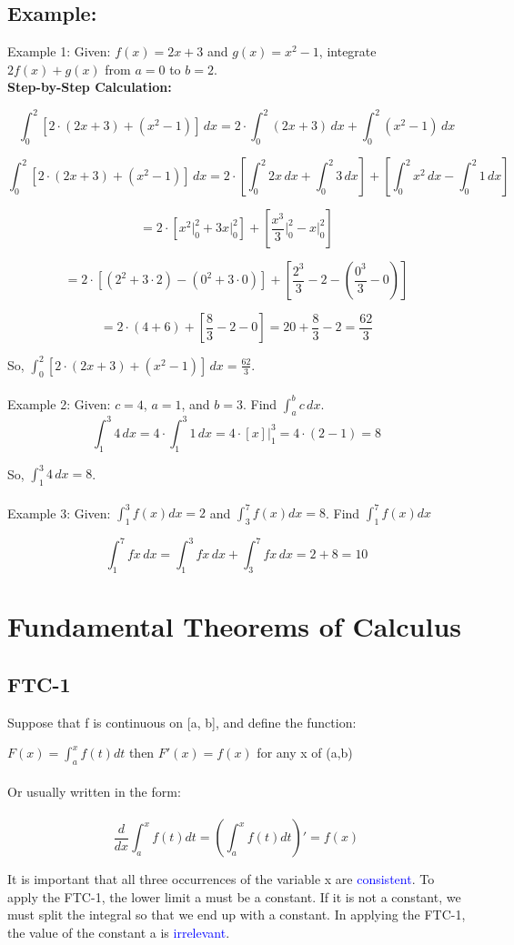 \documentclass{article}
\begin{document}
\subsection{Example:}

Example 1: Given: $f(x) = 2x + 3$ and $g(x) = x^2 - 1$, integrate $2f(x) + g(x)$ from $a = 0$ to $b = 2$.
\\
\textbf{Step-by-Step Calculation:}

\[
\int_0^2 [2 \cdot (2x + 3) + (x^2 - 1)] \,dx = 2 \cdot \int_0^2 (2x + 3) \,dx + \int_0^2 (x^2 - 1) \,dx
\]

\[
\int_0^2 [2 \cdot (2x + 3) + (x^2 - 1)] \,dx = 2 \cdot \left[\int_0^2 2x \,dx + \int_0^2 3 \,dx\right] + \left[\int_0^2 x^2 \,dx - \int_0^2 1 \,dx\right]
\]

\[
= 2 \cdot \left[x^2 \bigg|_0^2 + 3x \bigg|_0^2\right] + \left[\frac{x^3}{3} \bigg|_0^2 - x \bigg|_0^2\right]
\]

\[
= 2 \cdot [(2^2 + 3 \cdot 2) - (0^2 + 3 \cdot 0)] + \left[\frac{2^3}{3} - 2 - \left(\frac{0^3}{3} - 0\right)\right]
\]

\[
= 2 \cdot (4 + 6) + \left[\frac{8}{3} - 2 - 0\right] = 20 + \frac{8}{3} - 2 = \frac{62}{3}
\]

So, $\int_0^2 [2 \cdot (2x + 3) + (x^2 - 1)] \,dx = \frac{62}{3}$.
\\
\\
Example 2: Given: $c = 4$, $a = 1$, and $b = 3$. Find $\int_a^b c \,dx$.
\[
\int_1^3 4 \,dx = 4 \cdot \int_1^3 1 \,dx = 4 \cdot [x] \bigg|_1^3 = 4 \cdot ( 2 - 1 ) = 8
\]

So, $\int_1^3 4 \,dx = 8$.
\\
\\
Example 3: Given: $\int_1^3 f(x) dx = 2 $ and $\int_3^7 f(x) dx = 8 $. Find $\int_1^7 f(x) dx$

\[
\int_1^7 fx \,dx = \int_1^3 fx \,dx  + \int_3^7 fx \,dx= 2 + 8 = 10
\]

\section{Fundamental Theorems of Calculus}
\subsection{FTC-1}
Suppose that f is continuous on [a, b], and define the function:
\\
\begin{mdframed}
$F(x) = \int_{a}^{x} f(t) dt$ then $F'(x) = f(x)$ for any x of (a,b)
\\
\\
Or usually written in the form:
\\
\\
$$\frac{d}{dx} \int_{a}^{x}f(t)dt = (\int_{a}^{x}f(t)dt)' = f(x)$$
\end{mdframed}
It is important that all three occurrences of the variable x are \textcolor{blue}{consistent}. To apply the FTC-1, the lower limit a must be a constant. If it is not a constant, we must split the integral so that we end up with a constant. In applying the FTC-1, the value of the constant a is \textcolor{blue}{irrelevant}.
\end{document}
